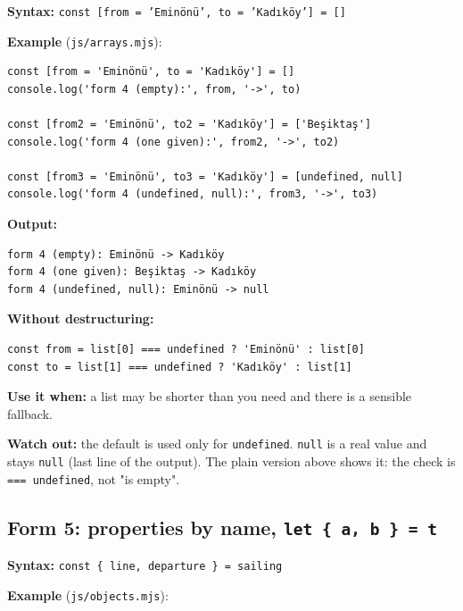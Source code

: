 \documentclass[
  10pt,
]{article}
\begin{document}
\textbf{Syntax:}
\texttt{const [\allowbreak{}from =\allowbreak{} 'Eminönü',\allowbreak{} to =\allowbreak{} 'Kadıköy'] =\allowbreak{} [\allowbreak{}]}

\textbf{Example} (\texttt{js/\allowbreak{}arrays.\allowbreak{}mjs}):

\begin{verbatim}
const [from = 'Eminönü', to = 'Kadıköy'] = []
console.log('form 4 (empty):', from, '->', to)

const [from2 = 'Eminönü', to2 = 'Kadıköy'] = ['Beşiktaş']
console.log('form 4 (one given):', from2, '->', to2)

const [from3 = 'Eminönü', to3 = 'Kadıköy'] = [undefined, null]
console.log('form 4 (undefined, null):', from3, '->', to3)
\end{verbatim}

\textbf{Output:}

\begin{verbatim}
form 4 (empty): Eminönü -> Kadıköy
form 4 (one given): Beşiktaş -> Kadıköy
form 4 (undefined, null): Eminönü -> null
\end{verbatim}

\textbf{Without destructuring:}

\begin{verbatim}
const from = list[0] === undefined ? 'Eminönü' : list[0]
const to = list[1] === undefined ? 'Kadıköy' : list[1]
\end{verbatim}

\textbf{Use it when:} a list may be shorter than you need and there is a
sensible fallback.

\textbf{Watch out:} the default is used only for \texttt{undefined}.
\texttt{null} is a real value and stays \texttt{null} (last line of the
output). The plain version above shows it: the check is
\texttt{=\allowbreak{}=\allowbreak{}=\allowbreak{} undefined}, not "is
empty".

\hypertarget{form-5-properties-by-name-let--a-b---t}{%
\subsection{\texorpdfstring{Form 5: properties by name,
\texttt{let \{ a,\allowbreak{} b \} =\allowbreak{} t}}{Form 5: properties by name, }}\label{form-5-properties-by-name-let--a-b---t}}

\textbf{Syntax:}
\texttt{const \{ line,\allowbreak{} departure \} =\allowbreak{} sailing}

\textbf{Example} (\texttt{js/\allowbreak{}objects.\allowbreak{}mjs}):
\end{document}

